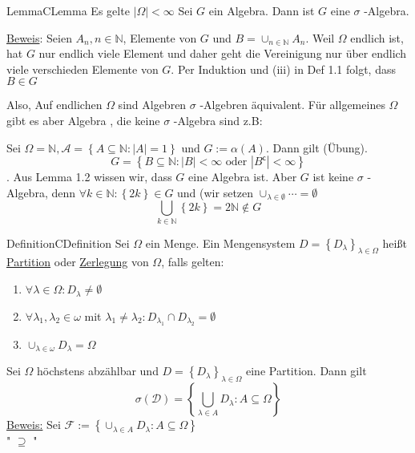 \documentclass[11.5 pt, a4paper]{memoir}
\begin{document}
\begin{ibox}[1.5]{Lemma}{CLemma}
    Es gelte $ |\Omega | < \infty $  Sei $ G $ ein Algebra. Dann ist $ G  $ eine $ \sigma $ -Algebra.
\end{ibox}
\underline{Beweis}: Seien $ A_n, n \in \mathbb{N} $, Elemente von $ G $ und $ B = \cup_{n \in \mathbb{N}}A_n $. Weil $ \Omega  $ 
endlich ist, hat $ G $ nur endlich viele Element und daher geht die Vereinigung nur über endlich viele verschieden Elemente von $ G $.
Per Induktion und (iii) in Def 1.1 folgt, dass $ B \in G $  


Also, Auf endlichen $ \Omega  $ sind Algebren $ \sigma $ -Algebren äquivalent. Für allgemeines $ \Omega  $ gibt es aber Algebra , die
keine $ \sigma $ -Algebra sind z.B:

Sei $ \Omega = \mathbb{N}, \mathcal{A} = \left\{ A \subseteq \mathbb{N} : |A| = 1 \right\} \text{ und }  G := \alpha (A) $. Dann
gilt (Übung). 
$$ G = \left\{ B \subseteq \mathbb{N} : |B| < \infty \text{ oder } |B^\mathsf{c}| < \infty  \right\} $$.
Aus Lemma 1.2 wissen wir, dass $ G $ eine Algebra ist. Aber $ G $ ist keine $ \sigma $ -Algebra, denn $ \forall k \in \mathbb{N}:
\left\{ 2k \right\} \in G$ und (wir setzen $ \cup_{\lambda \in \emptyset} \cdots = \emptyset $ 
$$ \bigcup_{k \in \mathbb{N}} \left\{ 2k \right\} = 2 \mathbb{N} \notin G $$

\begin{ibox}[1.7]{Definition}{CDefinition}
	Sei $ \Omega  $ ein Menge. Ein Mengensystem $ D = \left\{ D_{\lambda} \right\}_{\lambda \in \Omega } $ heißt \underline{Partition}
	oder \underline{Zerlegung} von $ \Omega  $, falls gelten:
	\begin{enumerate}[label=\alph*)]
		\item $ \forall \lambda \in \Omega : D_{\lambda} \neq \emptyset $ 
		\item $ \forall \lambda_1, \lambda_2 \in \omega  $ mit $ \lambda_1 \neq \lambda_2: D_{\lambda_1} \cap D_{\lambda_2} = \emptyset $ 
		\item $ \cup_{\lambda \in \omega } D_{\lambda} = \Omega $ 
	\end{enumerate}
\end{ibox}
	Sei $ \Omega  $ höchstens abzählbar und $ D = \left\{ D_{\lambda} \right\}_{\lambda \in \Omega } $ eine Partition. Dann gilt 
	$$ \sigma (\mathcal{D}) = \left\{ \bigcup_{\lambda \in A} D_{\lambda} : A \subseteq \Omega  \right\}$$
	\underline{Beweis:} Sei $ \mathcal{F} := \left\{ \cup_{\lambda \in A} D_{\lambda}: A \subseteq \Omega \right\} $  \\
	" \underline{$ \supseteq $} "\\
\end{document}
